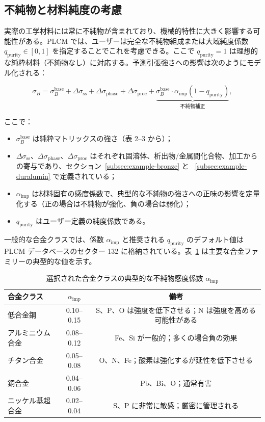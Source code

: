 \documentclass[11pt,a4paper]{article}
\theoremstyle{remark}
\begin{document}
	\subsection{不純物と材料純度の考慮}
	\label{subsec:purity}
	
	実際の工学材料には常に不純物が含まれており、機械的特性に大きく影響する可能性がある。PLCM では、ユーザーは完全な不純物組成または大域純度係数 \(q_{\mathrm{purity}} \in [0,1]\) を指定することでこれを考慮できる。ここで \(q_{\mathrm{purity}}=1\) は理想的な純粋材料（不純物なし）に対応する。予測引張強さへの影響は次のようにモデル化される：
	
	\[
	\sigma_B = \sigma_B^{\mathrm{base}} + \Delta\sigma_{\mathrm{ss}} + \Delta\sigma_{\mathrm{phase}} + \Delta\sigma_{\mathrm{proc}} + \underbrace{\sigma_B^{\mathrm{base}} \cdot \alpha_{\mathrm{imp}} (1 - q_{\mathrm{purity}})}_{\text{不純物補正}},
	\]
	
	ここで：
	\begin{itemize}
		\item \(\sigma_B^{\mathrm{base}}\) は純粋マトリックスの強さ（表 2–3 から）；
		\item \(\Delta\sigma_{\mathrm{ss}}\)、\(\Delta\sigma_{\mathrm{phase}}\)、\(\Delta\sigma_{\mathrm{proc}}\) はそれぞれ固溶体、析出物/金属間化合物、加工からの寄与であり、セクション~\ref{subsec:example-bronze} と ~\ref{subsec:example-duralumin} で定義されている；
		\item \(\alpha_{\mathrm{imp}}\) は材料固有の感度係数で、典型的な不純物の強さへの正味の影響を定量化する（正の場合は不純物が強化、負の場合は弱化）；
		\item \(q_{\mathrm{purity}}\) はユーザー定義の純度係数である。
	\end{itemize}
	
	一般的な合金クラスでは、係数 \(\alpha_{\mathrm{imp}}\) と推奨される \(q_{\mathrm{purity}}\) のデフォルト値は PLCM データベースのセクター 132 に格納されている。表~\ref{tab:impurity-coefficients} は主要な合金ファミリーの典型的な値を示す。
	
	\begin{table}[htbp]
		\centering
		\caption{選択された合金クラスの典型的な不純物感度係数 \(\alpha_{\mathrm{imp}}\)}
		\label{tab:impurity-coefficients}
		\begin{tabular}{lcc}
			\toprule
			\textbf{合金クラス} & \(\alpha_{\mathrm{imp}}\) & \textbf{備考} \\
			\midrule
			低合金鋼 & 0.10–0.15 & S、P、O は強度を低下させる；N は強度を高める可能性がある \\
			アルミニウム合金 & 0.08–0.12 & Fe、Si が一般的；多くの場合負の効果 \\
			チタン合金 & 0.05–0.08 & O、N、Fe；酸素は強化するが延性を低下させる \\
			銅合金 & 0.04–0.06 & Pb、Bi、O；通常有害 \\
			ニッケル基超合金 & 0.02–0.04 & S、P に非常に敏感；厳密に管理される \\
			\bottomrule
		\end{tabular}
	\end{table}
	
\end{document}
